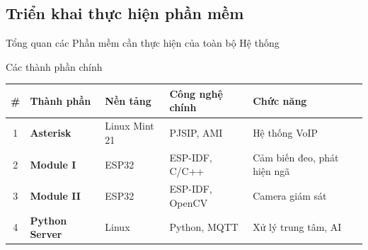 
\subsection{Triển khai thực hiện phần mềm}

\begin{frame}{Tổng quan các Phần mềm cần thực hiện của toàn bộ Hệ thống}
\small
\begin{block}{Các thành phần chính}
\begin{center}
\setlength{\tabcolsep}{6pt} %
\renewcommand{\arraystretch}{1.3} %
\begin{tabular}{c l l l l}
\hline
\textbf{\#} & \textbf{Thành phần} & \textbf{Nền tảng} & \textbf{Công nghệ chính} & \textbf{Chức năng} \\
\hline
1 & \textbf{Asterisk} & Linux Mint 21 & PJSIP, AMI & Hệ thống VoIP \\
2 & \textbf{Module I} & ESP32 & ESP-IDF, C/C++ & Cảm biến đeo, phát hiện ngã \\
3 & \textbf{Module II} & ESP32 & ESP-IDF, OpenCV & Camera giám sát \\
4 & \textbf{Python Server} & Linux & Python, MQTT & Xử lý trung tâm, AI \\
\hline
\end{tabular}
\end{center}
\end{block}
\end{frame}
